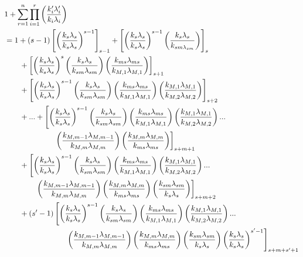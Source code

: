 \begin{align*}
    & 1 + \sum_{r=1}^n \prod_{i=1}^r \parfrac{k_i' \lami{i}'}{k_i \lami{i}} \\
    &= 1 + \left( s-1 \right) \left[ \parfrac{k_s \lami{s}}{k_s \lami{s}}^{s-1} \right]_{s-1} + \left[ \parfrac{k_s \lami{s}}{k_s \lami{s}}^{s-1} \parfrac{k_s \lami{s}}{k_{sm \lami{sm}}} \right]_{s} \\
    & \hspace{20px} + \left[ \parfrac{k_s \lami{s}}{k_s \lami{s}}^s \parfrac{k_s \lami{s}}{k_{sm } \lami{sm}} \parfrac{k_{ms} \lami{ms}}{k_{M,1} \lami{M,1}} \right]_{s+1} \\
    & \hspace{20px} + \left[ \parfrac{k_s \lami{s}}{k_s \lami{s}}^{s-1} \parfrac{k_s \lami{s}}{k_{sm} \lami{sm}} \parfrac{k_{ms} \lami{ms}}{k_{M,1} \lami{M,1}} \parfrac{k_{M,1} \lami{M,1}}{k_{M,2} \lami{M,2}} \right]_{s+2} \\ 
    & \hspace{20px} + ... + \left[ \parfrac{k_s \lami{s}}{k_s \lami{s}}^{s-1} \parfrac{k_s \lami{s}}{k_{sm} \lami{sm}} \parfrac{k_{ms} \lami{ms}}{k_{M,1} \lami{M,1}} \parfrac{k_{M,1} \lami{M,1}}{k_{M,2} \lami{M,2}} ... \right. \\
    & \hspace{65px} \left. \parfrac{k_{M,m-1} \lami{M,m-1}}{k_{M,m} \lami{M,m}} \parfrac{k_{M,m} \lami{M,m}}{k_{ms} \lami{ms}} \right]_{s+m+1} \\
    & \hspace{20px} + \left[ \parfrac{k_s \lami{s}}{k_s \lami{s}}^{s-1} \parfrac{k_s \lami{s}}{k_{sm} \lami{sm}} \parfrac{k_{ms} \lami{ms}}{k_{M,1} \lami{M,1}} \parfrac{k_{M,1} \lami{M,1}}{k_{M,2} \lami{M,2}} ... \right. \\
    & \hspace{40px} \left. \parfrac{k_{M,m-1} \lami{M,m-1}}{k_{M,m} \lami{M,m}} \parfrac{k_{M,m} \lami{M,m}}{k_{ms} \lami{ms}} \parfrac{k_{sm} \lami{sm}}{k_s \lami{s}} \right]_{s+m+2} \\
    & \hspace{20px} + \left( s'-1 \right) \left[ \parfrac{k_s \lami{s}}{k_s \lami{s}}^{s-1} \parfrac{k_s \lami{s}}{k_{sm} \lami{sm}} \parfrac{k_{ms} \lami{ms}}{k_{M,1} \lami{M,1}} \parfrac{k_{M,1} \lami{M,1}}{k_{M,2} \lami{M,2}} ... \right. \\
    & \hspace{80px} \left. \parfrac{k_{M,m-1} \lami{M,m-1}}{k_{M,m} \lami{M,m}} \parfrac{k_{M,m} \lami{M,m}}{k_{ms} \lami{ms}} \parfrac{k_{sm} \lami{sm}}{k_s \lami{s}} \parfrac{k_s \lami{s}}{k_s \lami{s}}^{s'-1} \right]_{s+m+s'+1} \\

\end{align*}
